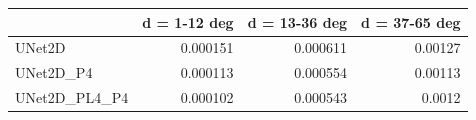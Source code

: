 \begin{tabular}{lrrr}
\toprule
 & d = 1-12 deg & d = 13-36 deg & d = 37-65 deg \\
\midrule
UNet2D & 0.000151 & 0.000611 & 0.00127 \\
UNet2D\_P4 & 0.000113 & 0.000554 & 0.00113 \\
UNet2D\_PL4\_P4 & 0.000102 & 0.000543 & 0.0012 \\
\bottomrule
\end{tabular}
